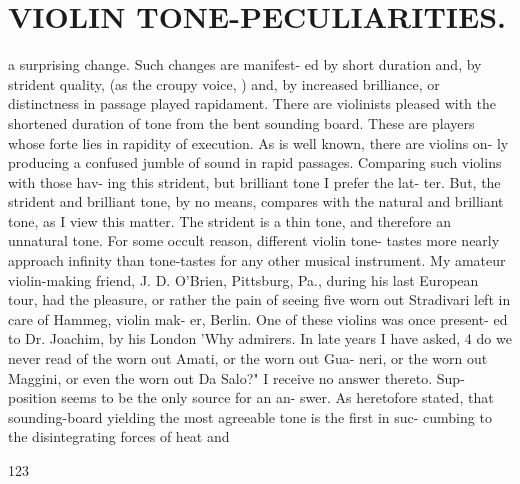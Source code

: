 \documentclass{article}
\begin{document}
\section*{VIOLIN TONE-PECULIARITIES.}
a surprising change. Such changes are manifest- ed by short duration and, by strident quality, (as the croupy voice, ) and, by increased brilliance, or distinctness in passage played rapidament. There are violinists pleased with the shortened duration of tone from the bent sounding board. These are players whose forte lies in rapidity of execution. As is well known, there are violins on- ly producing a confused jumble of sound in rapid passages. Comparing such violins with those hav- ing this strident, but brilliant tone I prefer the lat- ter. But, the strident and brilliant tone, by no means, compares with the natural and brilliant tone, as I view this matter. The strident is a thin tone, and therefore an unnatural tone. For some occult reason, different violin tone- tastes more nearly approach infinity than tone-tastes for any other musical instrument. My amateur violin-making friend, J. D. O'Brien, Pittsburg, Pa., during his last European tour, had the pleasure, or rather the pain of seeing five worn out Stradivari left in care of Hammeg, violin mak- er, Berlin. One of these violins was once present- ed to Dr. Joachim, by his London 'Why admirers. In late years I have asked, 4 do we never read of the worn out Amati, or the worn out Gua- neri, or the worn out Maggini, or even the worn out Da Salo?" I receive no answer thereto. Sup- position seems to be the only source for an an- swer. As heretofore stated, that sounding-board yielding the most agreeable tone is the first in suc- cumbing to the disintegrating forces of heat and

123
\end{document}
